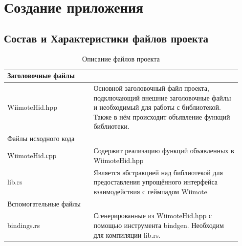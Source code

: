 \section{Создание приложения}

\subsection{Состав и Характеристики файлов проекта}
\begin{table}[!h]
    \centering
    \begin{tabular}{p{0.35\linewidth} | p{0.6\linewidth}|}
        \hline
        \multicolumn{2}{|l|}{Заголовочные файлы} \\ \hline
        \multicolumn{1}{|l|}{WiimoteHid.hpp} & Основной заголовочный файл проекта, подключающий внешние заголовочные файлы и необходимый для работы с библиотекой.
        Также в нём происходит объявление функций библиотеки. \\ \hline
        \multicolumn{2}{|l|}{Файлы исходного кода} \\ \hline
        \multicolumn{1}{|l|}{WiimoteHid.сpp} & Содержит реализацию функций объявленных в WiimoteHid.hpp \\ \hline
        \multicolumn{1}{|l|}{lib.rs} & Является абстракцией над библиотекой для предоставления упрощённого интерфейса взаимодействия с геймпадом Wiimote \\ \hline
        \multicolumn{2}{|l|}{Вспомогательные файлы} \\ \hline
        \multicolumn{1}{|l|}{bindings.rs} & Сгенерированные из WiimoteHid.hpp с помощью инструмента bindgen.
        Необходим для компиляции lib.rs. \\ \hline
    \end{tabular}
    \caption{\label{tab:table-name}Описание файлов проекта}
\end{table}
